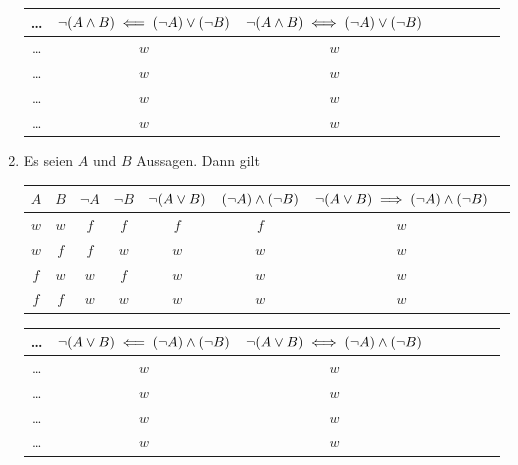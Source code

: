 \documentclass[german,12pt]{homework}
\DeclarePairedDelimiter{\enbrace}{(}{)}
\begin{document}
\begin{enumerate}
\begin{center}
            \begin{tabular}{cccccccc}
                \toprule
                \ldots & \(\lnot\enbrace*{A \land B} \impliedby \enbrace*{\lnot{A}} \lor \enbrace*{\lnot{B}}\) & \(\lnot\enbrace*{A \land B} \iff \enbrace*{\lnot{A}} \lor \enbrace*{\lnot{B}}\)\\
                \midrule
                \ldots & \(w\) & \(w\)\\
                \ldots & \(w\) & \(w\)\\
                \ldots & \(w\) & \(w\)\\
                \ldots & \(w\) & \(w\)\\
                \bottomrule
            \end{tabular}
        \end{center}
        \item Es seien \(A\) und \(B\) Aussagen. Dann gilt
        \begin{center}
            \begin{tabular}{cccccccc}
                \toprule
                \(A\) & \(B\) & \(\lnot{A}\) & \(\lnot{B}\) & \(\lnot\enbrace*{A \lor B}\) & \(\enbrace*{\lnot{A}} \land \enbrace*{\lnot{B}}\) & \(\lnot\enbrace*{A \lor B} \implies \enbrace*{\lnot{A}} \land \enbrace*{\lnot{B}}\)\\
                \midrule
                \(w\) & \(w\) & \(f\) & \(f\) & \(f\) & \(f\) & \(w\)\\
                \(w\) & \(f\) & \(f\) & \(w\) & \(w\) & \(w\) & \(w\)\\
                \(f\) & \(w\) & \(w\) & \(f\) & \(w\) & \(w\) & \(w\)\\
                \(f\) & \(f\) & \(w\) & \(w\) & \(w\) & \(w\) & \(w\)\\
                \bottomrule
            \end{tabular}

            \vspace{.2in}

            \begin{tabular}{cccccccc}
                \toprule
                \ldots & \(\lnot\enbrace*{A \lor B} \impliedby \enbrace*{\lnot{A}} \land \enbrace*{\lnot{B}}\) & \(\lnot\enbrace*{A \lor B} \iff \enbrace*{\lnot{A}} \land \enbrace*{\lnot{B}}\)\\
                \midrule
                \ldots & \(w\) & \(w\)\\
                \ldots & \(w\) & \(w\)\\
                \ldots & \(w\) & \(w\)\\
                \ldots & \(w\) & \(w\)\\
                \bottomrule
            \end{tabular}
        \end{center}
    \end{enumerate}
\end{document}
